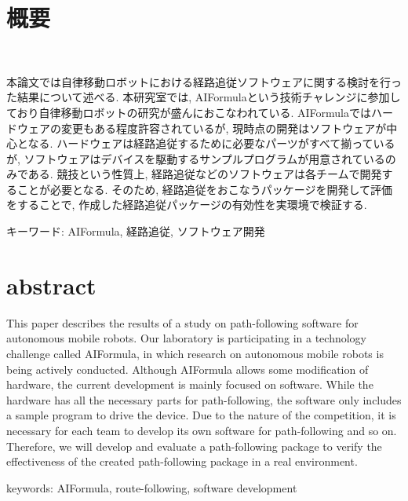 \chapter*{概要}
\thispagestyle{empty}
%
\begin{center}
  \scalebox{1.5}{AIFormulaにおける経路追従ソフトウェアの検討}\\
\end{center}
\vspace{1.0zh}
%

%
本論文では自律移動ロボットにおける経路追従ソフトウェアに関する検討を行った結果について述べる.
本研究室では, AIFormulaという技術チャレンジに参加しており自律移動ロボットの研究が盛んにおこなわれている.
AIFormulaではハードウェアの変更もある程度許容されているが, 現時点の開発はソフトウェアが中心となる.
ハードウェアは経路追従するために必要なパーツがすべて揃っているが, ソフトウェアはデバイスを駆動するサンプルプログラムが用意されているのみである.
競技という性質上, 経路追従などのソフトウェアは各チームで開発することが必要となる.
そのため, 経路追従をおこなうパッケージを開発して評価をすることで, 作成した経路追従パッケージの有効性を実環境で検証する.
%
%
%
%
%
%
%
%
%
%
%
%
%

\vspace{2.0zh}

キーワード: AIFormula, 経路追従, ソフトウェア開発
%

\newpage
\chapter*{abstract}
\thispagestyle{empty}
%
\begin{center}
  \scalebox{1.3}{Examination of route-following software in AIFormula}
\end{center}
\vspace{1.0zh}
%
This paper describes the results of a study on path-following software for autonomous mobile robots.
Our laboratory is participating in a technology challenge called AIFormula, in which research on autonomous mobile robots is being actively conducted.
Although AIFormula allows some modification of hardware, the current development is mainly focused on software.
While the hardware has all the necessary parts for path-following, the software only includes a sample program to drive the device.
Due to the nature of the competition, it is necessary for each team to develop its own software for path-following and so on.
Therefore, we will develop and evaluate a path-following package to verify the effectiveness of the created path-following package in a real environment.
%
\vspace{2.0zh}

keywords: AIFormula, route-following, software development
